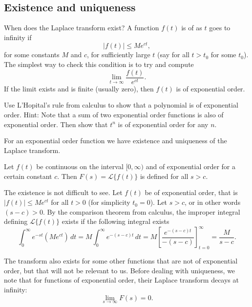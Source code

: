 \subsection{Existence and uniqueness}

When does the Laplace transform exist?  A function $f(t)$ is of
\emph{} as $t$ goes to infinity if
\begin{equation*}
\lvert f(t) \rvert \leq M e^{ct} ,
\end{equation*}
for some constants $M$ and $c$, for
sufficiently large $t$ (say for all $t > t_0$ for some $t_0$).  The simplest
way to check this condition is to try and compute
\begin{equation*}
\lim_{t\to \infty} \frac{f(t)}{e^{ct}} .
\end{equation*}
If the limit exists and is finite (usually zero), then $f(t)$ is of
exponential order.

\begin{exercise}
Use L'Hopital's rule from calculus to show that a polynomial is of
exponential order.  Hint: Note that a sum of two exponential order functions
is also of exponential order.  Then show that $t^n$ is of exponential order
for any $n$.
\end{exercise}

For an exponential order function we have existence and uniqueness of the
Laplace transform.

\begin{theorem}[Existence]
Let $f(t)$ be continuous on the interval $[0,\infty)$ and of exponential order for a certain
constant $c$.  Then $F(s) = \mathcal{L} \bigl\{ f(t) \bigr\}$ is defined for
all $s > c$.
\end{theorem}

The existence is not difficult to see.  Let $f(t)$ be of exponential order,
that is $\lvert f(t) \rvert \leq M e^{ct}$ for all $t > 0$ (for simplicity $t_0 = 0$).
Let $s > c$, or in other words $(s-c) > 0$.
By the comparison theorem from calculus, the improper integral defining
$\mathcal{L} \bigl\{ f(t) \bigr\}$ exists if the following integral exists
\begin{equation*}
\int_0^\infty e^{-st} ( M e^{ct} ) \,dt
=
M \int_0^\infty e^{-(s-c)t} \,dt = M \left[ \frac{e^{-(s-c)t}}{-(s-c)}
\right]_{t=0}^\infty = \frac{M}{s-c} .
\end{equation*}

The transform also exists for some other functions
that are not of exponential
order, but that will not be relevant to us.
Before dealing with uniqueness,
we note that for functions of exponential order, their
Laplace transform decays at infinity:
\begin{equation*}
\lim_{s\to\infty} F(s) = 0 .
\end{equation*}

